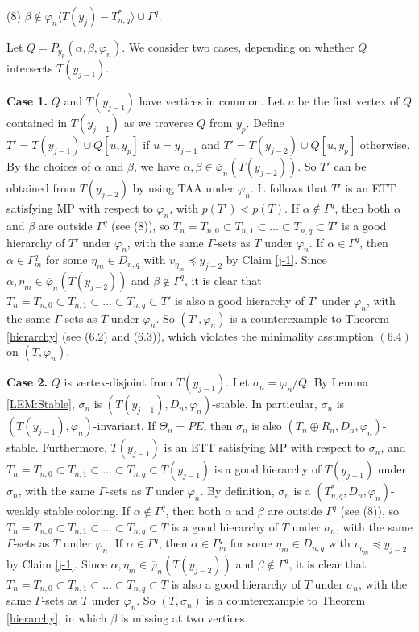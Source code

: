 \documentclass[11pt]{article}
\newcommand{\phibar}{\overline{\varphi}}
\begin{document}
(8) $\beta \notin \varphi_n \langle T(y_j) - T_{n,q}^* \rangle \cup \Gamma^{q}$. 

\noindent Let $Q=P_{y_{p}}(\alpha,\beta,\varphi_n)$. We consider two cases, depending on whether $Q$ intersects  $T(y_{j-1})$.

{\bf Case 1.} $Q$ and $T(y_{j-1})$ have vertices in common. Let $u$ be the first vertex of $Q$ contained in
$T(y_{j-1})$ as we traverse $Q$ from $y_p$. Define $T'=T(y_{j-1}) \cup Q[u,y_p]$ if $u= y_{j-1}$
and $T'=T(y_{j-2})\cup Q[u,y_p]$ otherwise.  By the choices of $\alpha$ and $\beta$, we have $\alpha,\beta \in
\phibar_n(T(y_{j-2}))$. So $T'$ can be obtained from $T(y_{j-2})$ by using TAA under $\varphi_n$. It follows
that $T'$ is an ETT satisfying MP with respect to $\varphi_n$, with $p(T')<p(T)$. If $\alpha\notin \Gamma^{q}$, then 
both $\alpha$ and $\beta$ are outside $\Gamma^{q}$ (see (8)), so $T_n=T_{n,0} \subset T_{n,1} \subset 
\ldots \subset T_{n,q}\subset T'$ is a good hierarchy of $T'$ under $\varphi_n$, with the same $\Gamma$-sets 
as $T$ under $\varphi_n$. If $\alpha\in \Gamma^{q}$, then $\alpha \in\Gamma^{q}_m$ for some $\eta_m\in D_{n,q}$ 
with $v_{\eta_m} \preceq y_{j-2}$ by Claim \ref{j-1}. Since $\alpha,\eta_m \in \phibar_n(T(y_{j-2}))$ and 
$\beta \notin \Gamma^{q}$, it is clear that $T_n=T_{n,0} \subset T_{n,1} \subset \ldots \subset T_{n,q}\subset T'$ 
is also a good hierarchy of $T'$ under $\varphi_n$, with the same $\Gamma$-sets as $T$ under $\varphi_n$. 
So $(T', \varphi_n)$ is a counterexample to Theorem \ref{hierarchy} (see (6.2) and (6.3)), which violates the 
minimality assumption $(6.4)$ on $(T, \varphi_n)$.

{\bf Case 2.} $Q$ is vertex-disjoint from $T(y_{j-1})$. Let $\sigma_n=\varphi_n/Q$. By Lemma \ref{LEM:Stable}, $\sigma_n$ is  $(T(y_{j-1}),D_n,\varphi_n)$-stable. In particular, $\sigma_n$ is  $(T(y_{j-1}),\varphi_n)$-invariant. If $\Theta_n=PE$, 
then $\sigma_n$ is also $(T_n\oplus R_n,D_n,\varphi_n)$-stable. Furthermore, $T(y_{j-1})$ is an ETT satisfying MP with respect to $\sigma_n$, and $T_n=T_{n,0} \subset T_{n,1} \subset \ldots \subset T_{n,q} \subset T(y_{j-1})$ is a good hierarchy of 
$T(y_{j-1})$ under $\sigma_n$, with the same $\Gamma$-sets as $T$ under $\varphi_n$. By definition, $\sigma_n$ is a $(T_{n,q}^*, D_n,\varphi_n)$-weakly stable coloring. If $\alpha\notin \Gamma^{q}$, then both $\alpha$ 
and $\beta$ are outside $\Gamma^{q}$ (see (8)), so $T_n=T_{n,0} \subset T_{n,1} \subset 
\ldots \subset T_{n,q}\subset T$ is a good hierarchy of $T$ under $\sigma_n$, with the same $\Gamma$-sets 
as $T$ under $\varphi_n$. If $\alpha\in \Gamma^{q}$, then $\alpha \in\Gamma^{q}_m$ for some $\eta_m\in D_{n,q}$ 
with $v_{\eta_m} \preceq y_{j-2}$ by Claim \ref{j-1}. Since $\alpha,\eta_m \in \phibar_n(T(y_{j-2}))$ and 
$\beta \notin \Gamma^{q}$, it is clear that $T_n=T_{n,0} \subset T_{n,1} \subset \ldots \subset T_{n,q}\subset T$ 
is also a good hierarchy of $T$ under $\sigma_n$, with the same $\Gamma$-sets as $T$ under $\varphi_n$. 
So $(T, \sigma_n)$ is a counterexample to Theorem \ref{hierarchy}, in which $\beta$ is missing at two vertices. 
\end{document}
